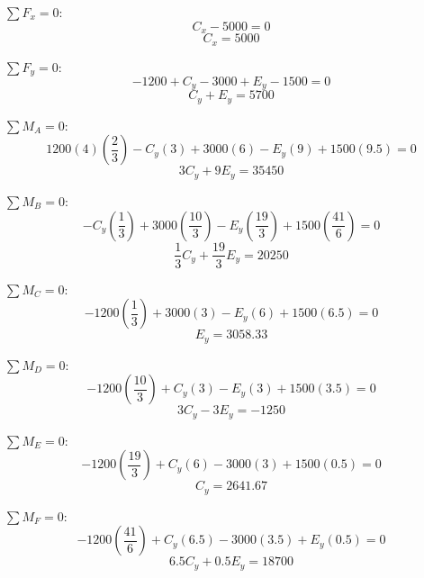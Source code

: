 \documentclass[letter,10pt,twoside]{article}
\begin{document}
$\sum{F_x} = 0$:
\begin{equation*}
    C_x - 5000 = 0
\end{equation*}
\begin{equation*}
    C_x = 5000
\end{equation*}

$\sum{F_y} = 0$:
\begin{equation*}
    -1200 + C_y - 3000 + E_y -1500 = 0
\end{equation*}
\begin{equation*}
    C_y + E_y = 5700
\end{equation*}

$\sum{M_A} = 0$:
\begin{equation*}
    1200(4)(\frac{2}{3}) - C_y(3) + 3000(6) - E_y(9) + 1500(9.5) = 0
\end{equation*}
\begin{equation*}
    3 C_y + 9 E_y = 35450
\end{equation*}

$\sum{M_B} = 0$:
\begin{equation*}
    - C_y(\frac{1}{3}) + 3000(\frac{10}{3}) - E_y(\frac{19}{3}) + 1500(\frac{41}{6}) = 0
\end{equation*}
\begin{equation*}
    \frac{1}{3}C_y + \frac{19}{3} E_y = 20250
\end{equation*}

$\sum{M_C} = 0$:
\begin{equation*}
    -1200(\frac{1}{3}) + 3000(3) - E_y(6) + 1500(6.5) = 0
\end{equation*}
\begin{equation*}
    E_y = 3058.33
\end{equation*}

$\sum{M_D} = 0$:
\begin{equation*}
    -1200(\frac{10}{3}) + C_y(3) - E_y(3) + 1500(3.5) = 0
\end{equation*}
\begin{equation*}
    3 C_y - 3 E_y = -1250
\end{equation*}

$\sum{M_E} = 0$:
\begin{equation*}
    -1200(\frac{19}{3}) + C_y(6) - 3000(3) + 1500(0.5) = 0
\end{equation*}
\begin{equation*}
    C_y = 2641.67
\end{equation*}

$\sum{M_F} = 0$:
\begin{equation*}
    -1200(\frac{41}{6}) + C_y(6.5) - 3000(3.5) + E_y(0.5) = 0
\end{equation*}
\begin{equation*}
    6.5 C_y + 0.5 E_y = 18700
\end{equation*}
\end{document}
